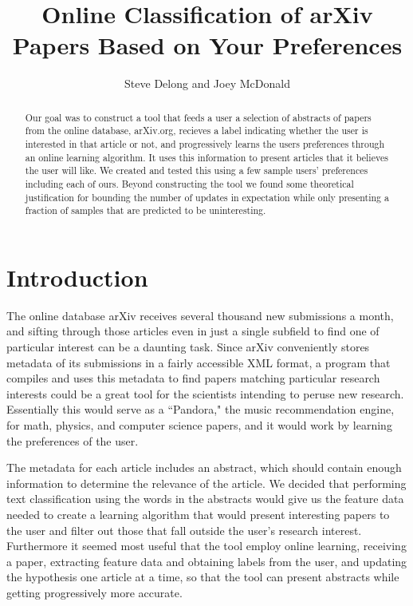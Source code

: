 \documentclass[12pt]{article}
\begin{document}
\title{Online Classification of arXiv Papers Based on Your Preferences}
\author{Steve Delong and Joey McDonald}
\maketitle
\begin{abstract}
Our goal was to construct a tool that feeds a user a selection of abstracts of papers from the online database, arXiv.org, recieves a label indicating whether the user is interested in that article or not, and progressively learns the users preferences through an online learning algorithm. It uses this information to present articles that it believes the user will like. We created and tested this using a few sample users' preferences including each of ours. Beyond constructing the tool we found some theoretical justification for bounding the number of updates in expectation while only presenting a fraction of samples that are predicted to be uninteresting.
\end{abstract}

\section{Introduction}

The online database arXiv receives several thousand new submissions a month, and sifting through those articles even in just a single subfield to find one of particular interest can be a daunting task. Since arXiv conveniently stores metadata of its submissions in a fairly accessible XML format, a program that compiles and uses this metadata to find papers matching particular research interests could be a great tool for the scientists intending to peruse new research. Essentially this would serve as a ``Pandora," the music recommendation engine, for math, physics, and computer science papers, and it would work by learning the preferences of the user.

The metadata for each article includes an abstract, which should contain enough information to determine the relevance of the article. We decided that performing text classification using the words in the abstracts would give us the feature data needed to create a learning algorithm that would present interesting papers to the user and filter out those that fall outside the user's research interest. Furthermore it seemed most useful that the tool employ online learning, receiving a paper, extracting feature data and obtaining labels from the user, and updating the hypothesis one article at a time, so that the tool can present abstracts while getting progressively more accurate.
\end{document}
